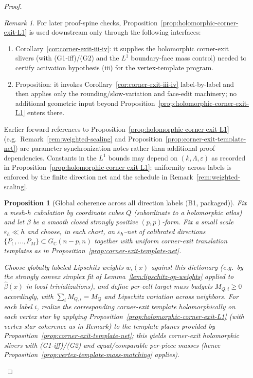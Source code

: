 \documentclass[11pt]{article}
\numberwithin{equation}{section}  %
\theoremstyle{plain}
\newtheorem{proposition}[theorem]{Proposition}
\theoremstyle{definition}
\theoremstyle{remark}
\newtheorem{remark}[theorem]{Remark}
\newcommand{\C}{\mathbb{C}}
\begin{document}
\begin{proof}
\begin{remark}
For later proof-spine checks, Proposition~\ref{prop:holomorphic-corner-exit-L1} is used downstream only through the following interfaces:
\begin{enumerate}
\item Corollary~\ref{cor:corner-exit-iii-iv}: it supplies the holomorphic corner-exit slivers (with (G1-iff)/(G2) and the $L^1$ boundary-face mass control) needed to certify activation hypothesis \textnormal{(iii)} for the vertex-template program.
\item Proposition: it invokes Corollary~\ref{cor:corner-exit-iii-iv} label-by-label and then applies only the rounding/slow-variation and face-edit machinery; no additional geometric input beyond Proposition~\ref{prop:holomorphic-corner-exit-L1} enters there.
\end{enumerate}
Earlier forward references to Proposition~\ref{prop:holomorphic-corner-exit-L1} (e.g.\ Remark~\ref{rem:weighted-scaling} and Proposition~\ref{prop:corner-exit-template-net})
are parameter-synchronization notes rather than additional proof dependencies.
Constants in the $L^1$ bounds may depend on $(k,\Lambda,\varepsilon)$ as recorded in Proposition~\ref{prop:holomorphic-corner-exit-L1};
uniformity across labels is enforced by the finite direction net and the schedule in Remark~\ref{rem:weighted-scaling}.

\end{remark}





\begin{proposition}[Global coherence across all direction labels (B1, packaged)]\label{prop:global-coherence-all-labels}
Fix a mesh-$h$ cubulation by coordinate cubes $Q$ (subordinate to a holomorphic atlas) and let $\beta$ be a smooth closed strongly positive $(p,p)$-form.
Fix a small scale $\varepsilon_h\ll h$ and choose, in each chart, an $\varepsilon_h$--net of calibrated directions
$\{P_1,\dots,P_M\}\subset G_\C(n-p,n)$ together with uniform corner-exit translation templates as in Proposition~\ref{prop:corner-exit-template-net}.

\smallskip\noindent
Choose \emph{globally labeled} Lipschitz weights $w_i(x)$ against this dictionary (e.g.\ by the strongly convex simplex fit of
Lemma~\ref{lem:lipschitz-qp-weights} applied to $\widehat\beta(x)$ in local trivializations), and define per-cell target mass budgets
$M_{Q,i}\ge 0$ accordingly, with $\sum_i M_{Q,i}=M_Q$ and Lipschitz variation across neighbors.
For each label $i$, realize the corresponding corner-exit template holomorphically on each vertex star by applying
Proposition~\ref{prop:holomorphic-corner-exit-L1} (with vertex-star coherence as in Remark) to the template planes provided by
Proposition~\ref{prop:corner-exit-template-net}; this yields corner-exit holomorphic slivers with (G1-iff)/(G2) and equal/comparable per-piece masses
(hence Proposition~\ref{prop:vertex-template-mass-matching} applies).


\end{proposition}
\end{proof}
\end{document}
